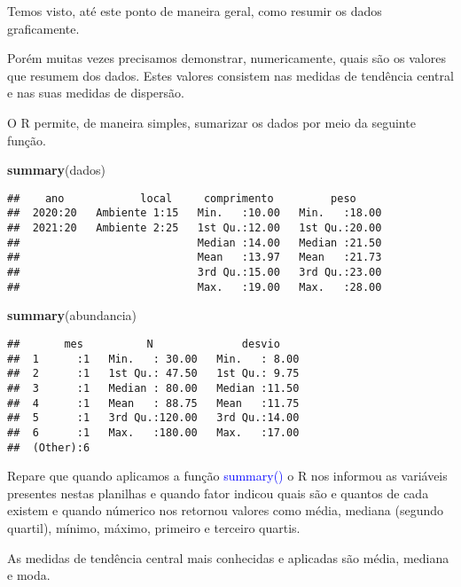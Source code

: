 \documentclass[titlepage, oneside, openany, a4paper]{book}
\newenvironment{Shaded}{\begin{snugshade}}{\end{snugshade}}
\newcommand{\KeywordTok}[1]{\textcolor[rgb]{0.13,0.29,0.53}{\textbf{#1}}}
\newcommand{\NormalTok}[1]{#1}
\begin{document}
Temos visto, até este ponto de maneira geral, como resumir os dados graficamente.

Porém muitas vezes precisamos demonstrar, numericamente, quais são os valores que resumem dos dados. Estes valores consistem nas medidas de tendência central e nas suas medidas de dispersão.

O R permite, de maneira simples, sumarizar os dados por meio da seguinte função.

\begin{Shaded}
\begin{Highlighting}[]
\KeywordTok{summary}\NormalTok{(dados)}
\end{Highlighting}
\end{Shaded}

\begin{verbatim}
##    ano            local     comprimento         peso      
##  2020:20   Ambiente 1:15   Min.   :10.00   Min.   :18.00  
##  2021:20   Ambiente 2:25   1st Qu.:12.00   1st Qu.:20.00  
##                            Median :14.00   Median :21.50  
##                            Mean   :13.97   Mean   :21.73  
##                            3rd Qu.:15.00   3rd Qu.:23.00  
##                            Max.   :19.00   Max.   :28.00
\end{verbatim}

\begin{Shaded}
\begin{Highlighting}[]
\KeywordTok{summary}\NormalTok{(abundancia)}
\end{Highlighting}
\end{Shaded}

\begin{verbatim}
##       mes          N              desvio     
##  1      :1   Min.   : 30.00   Min.   : 8.00  
##  2      :1   1st Qu.: 47.50   1st Qu.: 9.75  
##  3      :1   Median : 80.00   Median :11.50  
##  4      :1   Mean   : 88.75   Mean   :11.75  
##  5      :1   3rd Qu.:120.00   3rd Qu.:14.00  
##  6      :1   Max.   :180.00   Max.   :17.00  
##  (Other):6
\end{verbatim}

Repare que quando aplicamos a função \textcolor{blue}{summary()} o R nos informou as variáveis presentes nestas planilhas e quando fator indicou quais são e quantos de cada existem e quando númerico nos retornou valores como média, mediana (segundo quartil), mínimo, máximo, primeiro e terceiro quartis.

As medidas de tendência central mais conhecidas e aplicadas são média, mediana e moda.
\end{document}
